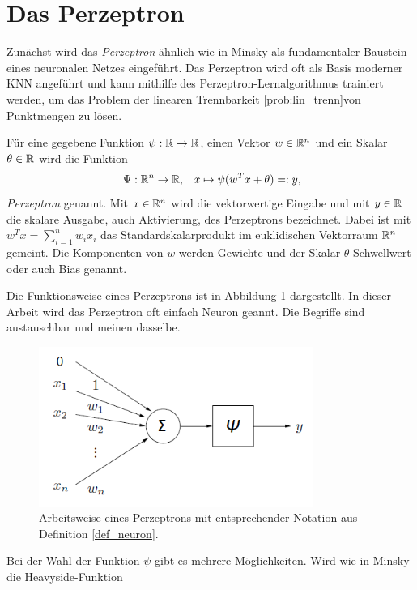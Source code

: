 \section{Das Perzeptron}
\label{perzeptron_abs}
Zunächst wird das \textit{Perzeptron} ähnlich wie in Minsky \cite{minsky2017perceptrons} als fundamentaler Baustein eines neuronalen Netzes eingeführt. Das Perzeptron wird oft als Basis moderner KNN angeführt und kann mithilfe des Perzeptron-Lernalgorithmus\cite{rosenblatt1958perceptron} trainiert werden, um das Problem der linearen Trennbarkeit \ref{prob:lin_trenn}von Punktmengen zu lösen.
\begin{defi}[Perzeptron]
    \label{def_neuron}
    Für eine gegebene Funktion $\psi: \mathbb{R} \rightarrow \mathbb{R}$, einen Vektor $w \in \mathbb{R}^{n}$ und ein Skalar $\theta \in \mathbb{R}$ wird die Funktion 
    \[ \
    \Psi: \mathbb{R}^n \rightarrow \mathbb{R}, \; \; \; x \mapsto \psi(w^T x +\theta)=:y,
    \]
    \textit{Perzeptron} genannt. Mit $x \in \mathbb{R}^{n}$ wird die vektorwertige Eingabe und mit $y \in \mathbb{R}$ die skalare Ausgabe, auch Aktivierung, des Perzeptrons bezeichnet. Dabei ist mit $w^Tx=\sum_{i=1}^n w_i x_i$ das Standardskalarprodukt im euklidischen Vektorraum $\mathbb{R}^{n}$ gemeint. Die Komponenten von $w$ werden Gewichte und der Skalar $\theta$ Schwellwert oder auch Bias genannt.
\end{defi}
Die Funktionsweise eines Perzeptrons ist in Abbildung \ref{funktionsweise_neuron} dargestellt. In dieser Arbeit wird das Perzeptron oft einfach Neuron geannt. Die Begriffe sind austauschbar und meinen dasselbe.
\begin{figure}[h]
    \includegraphics[width=0.8\textwidth]{pics/chapter_neuralnetworks/perzeptron.png}
    \centering
    \caption{Arbeitsweise eines Perzeptrons mit entsprechender Notation aus Definition \ref{def_neuron}.}
    \label{funktionsweise_neuron}
\end{figure}
Bei der Wahl der Funktion $\psi$ gibt es mehrere Möglichkeiten. Wird wie in Minsky\cite{minsky2017perceptrons} die Heavyside-Funktion
